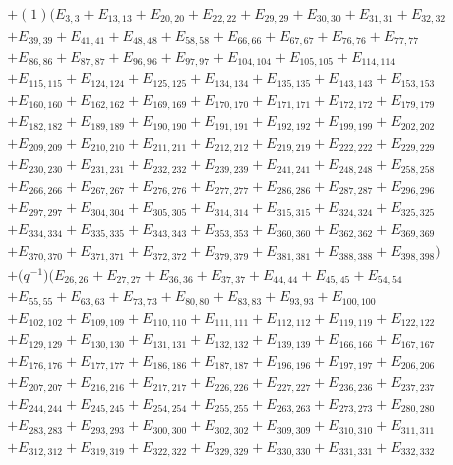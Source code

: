 \documentclass[10pt,a4paper]{amsart}
\numberwithin{equation}{section}
\theoremstyle{definition}
\begin{document}
\begin{align*}
&+(1)(E_{3,3}+E_{13,13}+E_{20,20}+E_{22,22}+E_{29,29}+E_{30,30}+E_{31,31}+E_{32,32}\\
&+E_{39,39}+E_{41,41}+E_{48,48}+E_{58,58}+E_{66,66}+E_{67,67}+E_{76,76}+E_{77,77}\\
&+E_{86,86}+E_{87,87}+E_{96,96}+E_{97,97}+E_{104,104}+E_{105,105}+E_{114,114}\\
&+E_{115,115}+E_{124,124}+E_{125,125}+E_{134,134}+E_{135,135}+E_{143,143}+E_{153,153}\\
&+E_{160,160}+E_{162,162}+E_{169,169}+E_{170,170}+E_{171,171}+E_{172,172}+E_{179,179}\\
&+E_{182,182}+E_{189,189}+E_{190,190}+E_{191,191}+E_{192,192}+E_{199,199}+E_{202,202}\\
&+E_{209,209}+E_{210,210}+E_{211,211}+E_{212,212}+E_{219,219}+E_{222,222}+E_{229,229}\\
&+E_{230,230}+E_{231,231}+E_{232,232}+E_{239,239}+E_{241,241}+E_{248,248}+E_{258,258}\\
&+E_{266,266}+E_{267,267}+E_{276,276}+E_{277,277}+E_{286,286}+E_{287,287}+E_{296,296}\\
&+E_{297,297}+E_{304,304}+E_{305,305}+E_{314,314}+E_{315,315}+E_{324,324}+E_{325,325}\\
&+E_{334,334}+E_{335,335}+E_{343,343}+E_{353,353}+E_{360,360}+E_{362,362}+E_{369,369}\\
&+E_{370,370}+E_{371,371}+E_{372,372}+E_{379,379}+E_{381,381}+E_{388,388}+E_{398,398})\\
&+\bigl(q^{-1}\bigr)(E_{26,26}+E_{27,27}+E_{36,36}+E_{37,37}+E_{44,44}+E_{45,45}+E_{54,54}\\
&+E_{55,55}+E_{63,63}+E_{73,73}+E_{80,80}+E_{83,83}+E_{93,93}+E_{100,100}\\
&+E_{102,102}+E_{109,109}+E_{110,110}+E_{111,111}+E_{112,112}+E_{119,119}+E_{122,122}\\
&+E_{129,129}+E_{130,130}+E_{131,131}+E_{132,132}+E_{139,139}+E_{166,166}+E_{167,167}\\
&+E_{176,176}+E_{177,177}+E_{186,186}+E_{187,187}+E_{196,196}+E_{197,197}+E_{206,206}\\
&+E_{207,207}+E_{216,216}+E_{217,217}+E_{226,226}+E_{227,227}+E_{236,236}+E_{237,237}\\
&+E_{244,244}+E_{245,245}+E_{254,254}+E_{255,255}+E_{263,263}+E_{273,273}+E_{280,280}\\
&+E_{283,283}+E_{293,293}+E_{300,300}+E_{302,302}+E_{309,309}+E_{310,310}+E_{311,311}\\
&+E_{312,312}+E_{319,319}+E_{322,322}+E_{329,329}+E_{330,330}+E_{331,331}+E_{332,332}\\

\end{align*}
\end{document}
